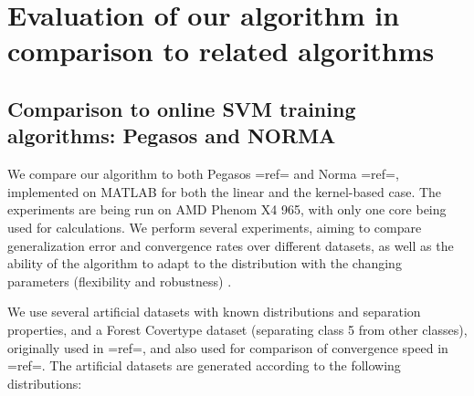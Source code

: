

\ifpdf
    \graphicspath{{5/figures/PNG/}{5/figures/PDF/}{5/figures/}}
\else
    \graphicspath{{5/figures/EPS/}{5/figures/}}
\fi


\captionsetup[subfigure]{labelfont=bf,textfont=normalfont,singlelinecheck=off,justification=centering}

\chapter{Evaluation of our algorithm in comparison to related algorithms} %
\section{Comparison to online SVM training algorithms: Pegasos and NORMA}

We compare our algorithm to both Pegasos {{=ref=}} and Norma {{=ref=}}, implemented on MATLAB for both the linear and the kernel-based case. The experiments are being run on AMD Phenom X4 965, with only one core being used for calculations. We perform several experiments, aiming to compare generalization error and convergence rates over different datasets, as well as the ability of the algorithm to adapt to the distribution with the changing parameters (flexibility and robustness) . 

We use several artificial datasets with known distributions and separation properties, and a Forest Covertype dataset (separating class 5 from other classes), originally used in {{=ref=}}, and also used for comparison of convergence speed in {{=ref=}}. The artificial datasets are generated  according to the following distributions:

